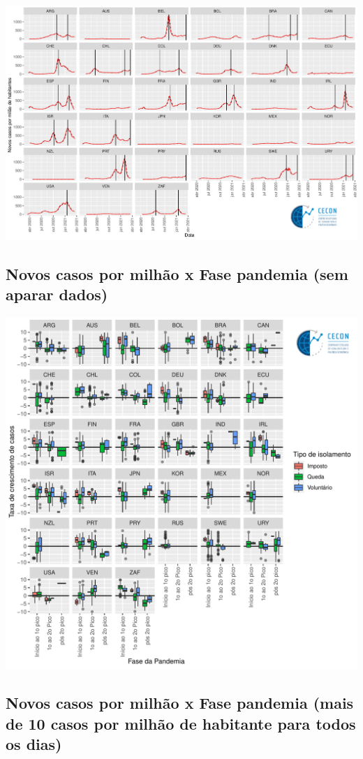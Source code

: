 \documentclass{SelfArx}
\begin{document}
\begin{center}
\includegraphics[width=.9\linewidth]{./figs/COVID/Picos.pdf}
\end{center}

\subsection*{Novos casos por milhão x Fase pandemia (sem aparar dados)}
\label{sec:org2941753}

\begin{center}
\includegraphics[width=.9\linewidth]{./figs/COVID/Casos_Policy_Todos.pdf}
\end{center}

\subsection*{Novos casos por milhão x Fase pandemia (mais de 10 casos por milhão de habitante para todos os dias)}
\label{sec:orgaa7ba38}
\end{document}
